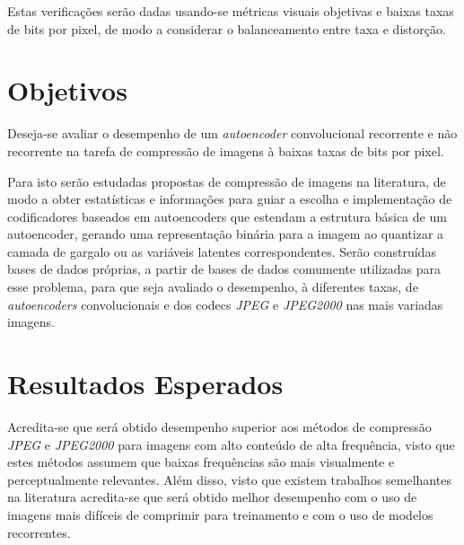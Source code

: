 Estas verificações serão dadas usando-se métricas visuais objetivas e baixas taxas de bits por pixel, de modo a considerar o balanceamento entre taxa e distorção.
\section{Objetivos}
\label{sec:objetivos}
Deseja-se avaliar o desempenho de um \textit{autoencoder} convolucional recorrente e não recorrente na tarefa de compressão de imagens à baixas taxas de bits por pixel.

Para isto serão estudadas propostas de compressão de imagens na literatura, de modo a obter estatísticas e informações para guiar a escolha e implementação de codificadores baseados em autoencoders que estendam a estrutura básica de um autoencoder, gerando uma representação binária para a imagem ao quantizar a camada de gargalo ou as variáveis latentes correspondentes. Serão construídas bases de dados próprias, a partir de bases de dados comumente utilizadas para esse problema, para que seja avaliado o desempenho, à diferentes taxas, de \textit{autoencoders} convolucionais e dos codecs \textit{JPEG} e \textit{JPEG2000} nas mais variadas imagens.
\section{Resultados Esperados}
\label{sec:expectativa}
Acredita-se que será obtido desempenho superior aos métodos de compressão \textit{JPEG} e \textit{JPEG2000} para imagens com alto conteúdo de alta frequência, visto que estes métodos assumem que baixas frequências são mais visualmente e perceptualmente relevantes. Além disso, visto que existem trabalhos semelhantes na literatura acredita-se que será obtido melhor desempenho com o uso de imagens mais difíceis de comprimir para treinamento e com o uso de modelos recorrentes. 

